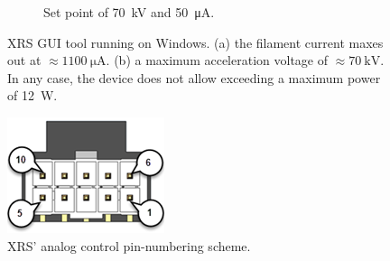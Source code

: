 \begin{figure}
\begin{subfigure}{.3\textwidth}
            \caption[Set point of \qty{70}{kV} and \qty{50}{\micro\ampere}]{Set point of \qty{70}{kV} and \qty{50}{\micro\ampere}.}%
            \label{subfig:12WattController 70kV}
        \end{subfigure}
        \caption[XRS GUI tool running on Windows]{XRS GUI tool running on Windows. (a) the filament current maxes out at \(\approx \qty{1100}{\micro\ampere}\). (b) a maximum acceleration voltage of \(\approx\qty{70}{\kilo\volt}\). In any case, the device does not allow exceeding a maximum power of \qty{12}{\watt}.}%
        \label{fig:12WattController 10kV and 70kV}
    \end{figure}
    \newpage
    \begin{figure}[t]
        \centering
        \includegraphics[width=.3\textwidth]{electronics/datasheets/XRS_10pin_male.png}
        \caption[XRS' analog control pin numbering scheme.]{XRS' analog control pin-numbering scheme.}%
        \label{fig:10 pin numbering scheme}
    \end{figure}
    \newpage
